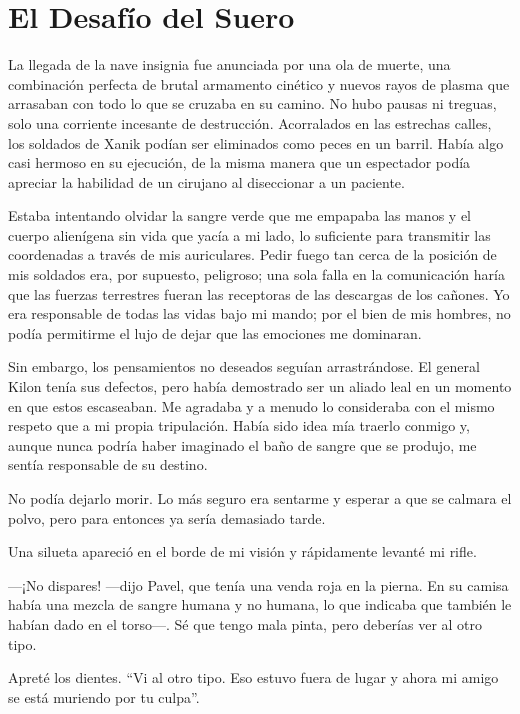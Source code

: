 \chapter{El Desafío del Suero}\label{sec:el-desafio-del-suero}

La llegada de la nave insignia fue anunciada por una ola de muerte, una combinación perfecta de brutal armamento cinético y nuevos rayos de plasma que arrasaban con todo lo que se cruzaba en su camino. No hubo pausas ni treguas, solo una corriente incesante de destrucción. Acorralados en las estrechas calles, los soldados de Xanik podían ser eliminados como peces en un barril. Había algo casi hermoso en su ejecución, de la misma manera que un espectador podía apreciar la habilidad de un cirujano al diseccionar a un paciente.

Estaba intentando olvidar la sangre verde que me empapaba las manos y el cuerpo alienígena sin vida que yacía a mi lado, lo suficiente para transmitir las coordenadas a través de mis auriculares. Pedir fuego tan cerca de la posición de mis soldados era, por supuesto, peligroso; una sola falla en la comunicación haría que las fuerzas terrestres fueran las receptoras de las descargas de los cañones. Yo era responsable de todas las vidas bajo mi mando; por el bien de mis hombres, no podía permitirme el lujo de dejar que las emociones me dominaran.

Sin embargo, los pensamientos no deseados seguían arrastrándose. El general Kilon tenía sus defectos, pero había demostrado ser un aliado leal en un momento en que estos escaseaban. Me agradaba y a menudo lo consideraba con el mismo respeto que a mi propia tripulación. Había sido idea mía traerlo conmigo y, aunque nunca podría haber imaginado el baño de sangre que se produjo, me sentía responsable de su destino.

No podía dejarlo morir. Lo más seguro era sentarme y esperar a que se calmara el polvo, pero para entonces ya sería demasiado tarde.

Una silueta apareció en el borde de mi visión y rápidamente levanté mi rifle.

—¡No dispares! —dijo Pavel, que tenía una venda roja en la pierna. En su camisa había una mezcla de sangre humana y no humana, lo que indicaba que también le habían dado en el torso—. Sé que tengo mala pinta, pero deberías ver al otro tipo.

Apreté los dientes. ``Vi al otro tipo. Eso estuvo fuera de lugar y ahora mi amigo se está muriendo por tu culpa''.

